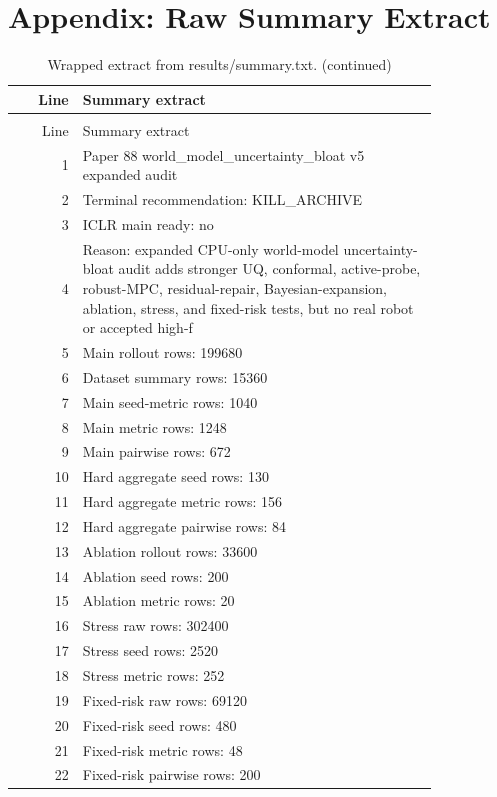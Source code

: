 \documentclass{article}
\begin{document}
\section{Appendix: Raw Summary Extract}

\begin{center}
\scriptsize
\begin{longtable}{rp{0.84\linewidth}}
\caption{Wrapped extract from results/summary.txt.}\label{tab:summaryextract}\\
\toprule
Line & Summary extract\\
\midrule
\endfirsthead
\caption[]{Wrapped extract from results/summary.txt. (continued)}\\
\toprule
Line & Summary extract\\
\midrule
\endhead
1 & Paper 88 world\_model\_uncertainty\_bloat v5 expanded audit\\
2 & Terminal recommendation: KILL\_ARCHIVE\\
3 & ICLR main ready: no\\
4 & Reason: expanded CPU-only world-model uncertainty-bloat audit adds stronger UQ, conformal, active-probe, robust-MPC, residual-repair, Bayesian-expansion, ablation, stress, and fixed-risk tests, but no real robot or accepted high-f\\
5 & Main rollout rows: 199680\\
6 & Dataset summary rows: 15360\\
7 & Main seed-metric rows: 1040\\
8 & Main metric rows: 1248\\
9 & Main pairwise rows: 672\\
10 & Hard aggregate seed rows: 130\\
11 & Hard aggregate metric rows: 156\\
12 & Hard aggregate pairwise rows: 84\\
13 & Ablation rollout rows: 33600\\
14 & Ablation seed rows: 200\\
15 & Ablation metric rows: 20\\
16 & Stress raw rows: 302400\\
17 & Stress seed rows: 2520\\
18 & Stress metric rows: 252\\
19 & Fixed-risk raw rows: 69120\\
20 & Fixed-risk seed rows: 480\\
21 & Fixed-risk metric rows: 48\\
22 & Fixed-risk pairwise rows: 200\\

\end{longtable}
\end{center}
\end{document}
